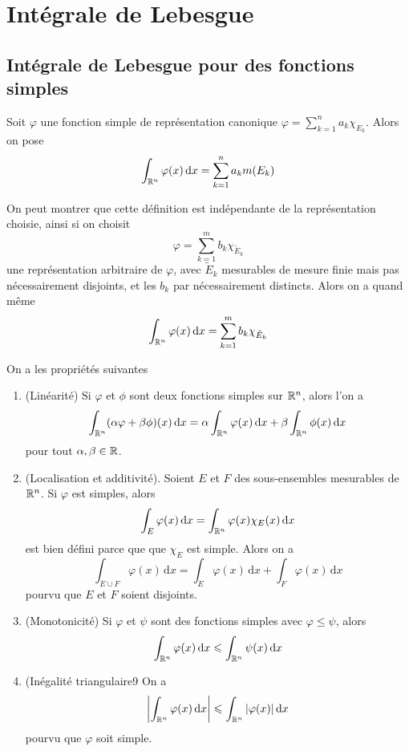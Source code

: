 \chapter{Intégrale de Lebesgue}
\section{Intégrale de Lebesgue pour des fonctions simples} 
\begin{definition}
	Soit $\varphi$ une fonction simple de représentation canonique $\varphi = \sum_{k = 1}^n a_k \chi_{E_k}$. Alors on pose
	\[
	\int_{\mathbb{R}^n} \varphi(x) \, \mathrm dx = \sum_{k=1}^n a_k m(E_k)
	\]
\end{definition}

\begin{remarque} \label{rem: Invariance par représentation}
	On peut montrer que cette définition est indépendante de la représentation choisie, ainsi si on choisit 
	\[
	\varphi = \sum_{k=1}^m b_k \chi_{\tilde E_k}
	\]
	une représentation arbitraire de $\varphi$, avec $\tilde E_k$ mesurables de mesure finie mais pas nécessairement disjoints, et les $b_k$ par nécessairement distincts. Alors on a quand même
	\[
	\int_{\mathbb{R}^n} \varphi(x) \, \mathrm dx = \sum_{k=1}^m b_k \chi_{\tilde E_k}
	\] 
\end{remarque}

\begin{proposition} \label{prop: Propriétés de l'intégrale de fonctions simples}
	On a les propriétés suivantes
	\begin{enumerate}
		\item (Linéarité) Si $\varphi$ et $\phi$ sont deux fonctions simples sur $\mathbb{R}^n$, alors l'on a
		\[
		\int_{\mathbb{R}^n} (\alpha \varphi + \beta \phi)(x)\, \mathrm dx = \alpha \int_{\mathbb{R}^n} \varphi(x) \, \mathrm dx + \beta \int_{\mathbb{R}^n} \phi(x) \, \mathrm dx
		\]
		pour tout $\alpha, \beta \in \mathbb{R}$.
		\item (Localisation et additivité). Soient $E$ et $F$ des sous-ensembles mesurables de $\mathbb{R}^n$. Si $\varphi$ est simples, alors
		\[
		\int_E \varphi(x) \, \mathrm dx = \int_{\mathbb{R}^n} \varphi(x) \chi_E(x) \, \mathrm dx
		\]
		est bien défini parce que que $\chi_E$ est simple. Alors on a
		\[
		\int_{E \cup F} \varphi(x) \, \mathrm dx = \int_E \varphi(x) \, \mathrm dx + \int_F \varphi(x) \, \mathrm dx
		\]
		pourvu que $E$ et $F$ soient disjoints.
		
		\item (Monotonicité) Si $\varphi$ et $\psi$ sont des fonctions simples avec $\varphi \leqslant \psi$, alors
		\[
		\int_{\mathbb{R}^n} \varphi(x) \, \mathrm dx \leqslant \int_{\mathbb{R}^n} \psi(x) \, \mathrm dx
		\]
		\item (Inégalité triangulaire9 On a
		\[
		\left|\int_{\mathbb{R}^n}\varphi(x) \, \mathrm dx\right| \leqslant \int_{\mathbb{R}^n} |\varphi(x)| \, \mathrm dx
		\]
		pourvu que $\varphi$ soit simple.
	\end{enumerate}
\end{proposition}


